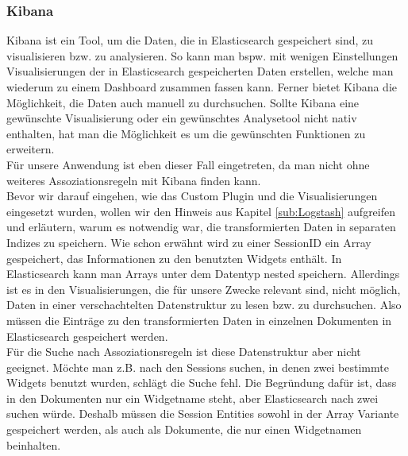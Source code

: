 \subsubsection{Kibana}
\label{ssub:Kibana}
Kibana ist ein Tool, um die Daten, die in Elasticsearch gespeichert sind, zu visualisieren bzw. zu analysieren. So kann man bspw. mit wenigen Einstellungen Visualisierungen der in Elasticsearch gespeicherten Daten erstellen, welche man wiederum zu einem Dashboard zusammen fassen kann. Ferner bietet Kibana die Möglichkeit, die Daten auch manuell zu durchsuchen. Sollte Kibana eine gewünschte Visualisierung oder ein gewünschtes Analysetool nicht nativ enthalten, hat man die Möglichkeit es um die gewünschten Funktionen zu erweitern.\\
Für unsere Anwendung ist eben dieser Fall eingetreten, da man nicht ohne weiteres Assoziationsregeln mit Kibana finden kann.\\
Bevor wir darauf eingehen, wie das Custom Plugin und die Visualisierungen eingesetzt wurden, wollen wir den Hinweis aus Kapitel \ref{sub:Logstash} aufgreifen und erläutern, warum es notwendig war, die transformierten Daten in separaten Indizes zu speichern. Wie schon erwähnt wird zu einer SessionID ein Array gespeichert, das Informationen zu den benutzten Widgets enthält. In Elasticsearch kann man Arrays unter dem Datentyp \glqq nested \grqq{} speichern. Allerdings ist es in den Visualisierungen, die für unsere Zwecke relevant sind, nicht möglich, Daten in einer verschachtelten Datenstruktur zu lesen bzw. zu durchsuchen. Also müssen die Einträge zu den transformierten Daten in einzelnen Dokumenten in Elasticsearch gespeichert werden.\\
Für die Suche nach Assoziationsregeln ist diese Datenstruktur aber nicht geeignet. Möchte man z.B. nach den Sessions suchen, in denen zwei bestimmte Widgets benutzt wurden, schlägt die Suche fehl. Die Begründung dafür ist, dass in den Dokumenten nur ein Widgetname steht, aber Elasticsearch nach zwei suchen würde. Deshalb müssen die Session Entities sowohl in der Array Variante gespeichert werden, als auch als Dokumente, die nur einen Widgetnamen beinhalten.

